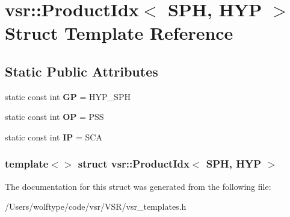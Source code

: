 \hypertarget{structvsr_1_1_product_idx_3_01_s_p_h_00_01_h_y_p_01_4}{\section{vsr\-:\-:Product\-Idx$<$ S\-P\-H, H\-Y\-P $>$ Struct Template Reference}
\label{structvsr_1_1_product_idx_3_01_s_p_h_00_01_h_y_p_01_4}
}
\subsection*{Static Public Attributes}
\begin{DoxyCompactItemize}
\item 
\hypertarget{structvsr_1_1_product_idx_3_01_s_p_h_00_01_h_y_p_01_4_a2c54d719f1a684ba6880a2982aa48b82}{static const int {\bfseries G\-P} = H\-Y\-P\-\_\-\-S\-P\-H}\label{structvsr_1_1_product_idx_3_01_s_p_h_00_01_h_y_p_01_4_a2c54d719f1a684ba6880a2982aa48b82}

\item 
\hypertarget{structvsr_1_1_product_idx_3_01_s_p_h_00_01_h_y_p_01_4_a97c9de503cd1c3cd7855c6072fa1e042}{static const int {\bfseries O\-P} = P\-S\-S}\label{structvsr_1_1_product_idx_3_01_s_p_h_00_01_h_y_p_01_4_a97c9de503cd1c3cd7855c6072fa1e042}

\item 
\hypertarget{structvsr_1_1_product_idx_3_01_s_p_h_00_01_h_y_p_01_4_a5f3601ee519b9d530d0cd20b1f893da8}{static const int {\bfseries I\-P} = S\-C\-A}\label{structvsr_1_1_product_idx_3_01_s_p_h_00_01_h_y_p_01_4_a5f3601ee519b9d530d0cd20b1f893da8}

\end{DoxyCompactItemize}
\subsubsection*{template$<$$>$ struct vsr\-::\-Product\-Idx$<$ S\-P\-H, H\-Y\-P $>$}



The documentation for this struct was generated from the following file\-:\begin{DoxyCompactItemize}
\item 
/\-Users/wolftype/code/vsr/\-V\-S\-R/vsr\-\_\-templates.\-h\end{DoxyCompactItemize}
